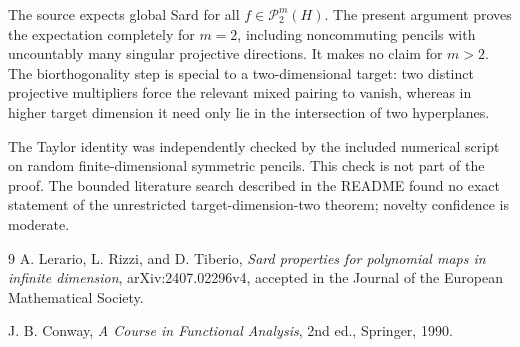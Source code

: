 \documentclass[11pt]{article}
\begin{document}
The source expects global Sard for all $f\in\mathscr P_2^m(H)$. The present
argument proves the expectation completely for $m=2$, including noncommuting
pencils with uncountably many singular projective directions. It makes no
claim for $m>2$. The biorthogonality step is special to a two-dimensional
target: two distinct projective multipliers force the relevant mixed pairing
to vanish, whereas in higher target dimension it need only lie in the
intersection of two hyperplanes.

The Taylor identity was independently checked by the included numerical script
on random finite-dimensional symmetric pencils. This check is not part of the
proof. The bounded literature search described in the README found no exact
statement of the unrestricted target-dimension-two theorem; novelty confidence
is moderate.

\begin{thebibliography}{9}
A. Lerario, L. Rizzi, and D. Tiberio,
\emph{Sard properties for polynomial maps in infinite dimension},
arXiv:2407.02296v4, accepted in the Journal of the European Mathematical
Society.

J. B. Conway,
\emph{A Course in Functional Analysis}, 2nd ed.,
Springer, 1990.
\end{thebibliography}
\end{document}
